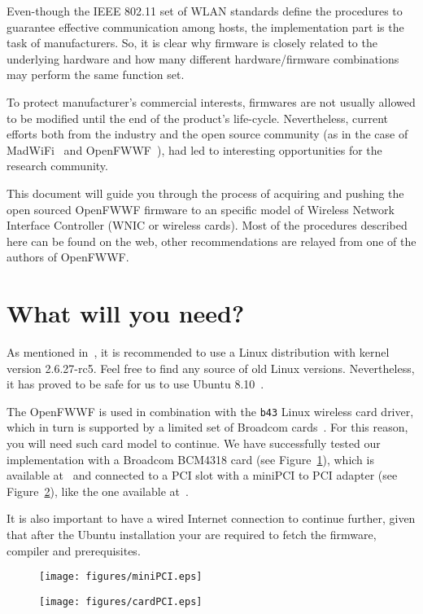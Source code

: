 \documentclass[conference]{IEEEtran}
\begin{document}
Even-though the IEEE 802.11 set of WLAN standards define the procedures to guarantee effective communication among hosts, the implementation part is the task of manufacturers. So, it is clear why firmware is closely related to the underlying hardware and how many different hardware/firmware combinations may perform the same function set.

To protect manufacturer's commercial interests, firmwares are not usually allowed to be modified until the end of the product's life-cycle. Nevertheless, current efforts both from the industry and the open source community (as in the case of MadWiFi~\cite{madWiFi} and OpenFWWF~\cite{OpenFWWF}), had led to interesting opportunities for the research community.

This document will guide you through the process of acquiring and pushing the open sourced OpenFWWF firmware to an specific model of Wireless Network Interface Controller (WNIC or wireless cards). Most of the procedures described here can be found on the web, other recommendations are relayed from one of the authors of OpenFWWF.

\section{What will you need?}\label{hardware}
As mentioned in~\cite{OpenFWWF}, it is recommended to use a Linux distribution with kernel version 2.6.27-rc5. Feel free to find any source of old Linux versions. Nevertheless, it has proved to be safe for us to use Ubuntu 8.10~\cite{ubuntu8}.

The OpenFWWF is used in combination with the \texttt{b43} Linux  wireless card driver, which in turn is supported by a limited set of Broadcom cards~\cite{b43-info}. For this reason, you will need such card model to continue. We have successfully tested our implementation with a Broadcom BCM4318 card (see Figure~\ref{fig:miniPCI}), which is available at~\cite{bcm4318} and connected to a PCI slot with a miniPCI to PCI adapter (see Figure~\ref{fig:PCI}), like the one available at~\cite{PCIAdapter}.

It is also important to have a wired Internet connection to continue further, given that after the Ubuntu installation your are required to fetch the firmware, compiler and prerequisites.

\begin{figure*}[t]
\centering
\begin{subfigure}{.5\textwidth}
  \centering
  \texttt{[image: figures/miniPCI.eps]}
  \caption{}
  \label{fig:miniPCI}
\end{subfigure}%
\begin{subfigure}{.5\textwidth}
  \centering
  \texttt{[image: figures/cardPCI.eps]}
  \caption{}
  \label{fig:PCI}
\end{subfigure}
\caption{\ref{fig:miniPCI}) Broadcom BCM418 miniPCI. \ref{fig:PCI}) Card correctly placed into the PCI adapter.}
\label{installedCard}
\end{figure*}
\end{document}

